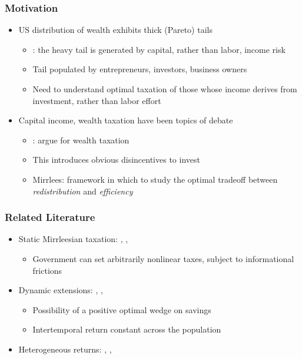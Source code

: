\documentclass{beamer}
\begin{document}
\begin{frame}
    \frametitle{Motivation}

    \begin{itemize}
        \item US distribution of wealth exhibits thick (Pareto) tails
        \begin{itemize}
            \item \cite{benhabib2011distribution}: the heavy tail is generated by capital, rather than labor, income risk 
            \item Tail populated by entrepreneurs, investors, business owners
            \item Need to understand optimal taxation of those whose income derives from investment, rather than labor effort
        \end{itemize} %
        \item Capital income, wealth taxation have been topics of debate
        \begin{itemize}
            \item \cite{saez2019triumph}: argue for wealth taxation 
            \item This introduces obvious disincentives to invest 
            \item Mirrlees: framework in which to study the optimal tradeoff between \textit{redistribution} and \textit{efficiency} 
        \end{itemize}
    \end{itemize}

\end{frame}

\begin{frame}
    \frametitle{Related Literature}

    \begin{itemize}
        \item Static Mirrleesian taxation: \cite{mirrlees1971exploration}, \cite{diamond1998optimal}, \cite{saez2001using}
        \begin{itemize}
            \item Government can set arbitrarily nonlinear taxes, subject to informational frictions
        \end{itemize}
        \item Dynamic extensions: \cite{golosov2003optimal}, \cite{kocherlakota2005zero}, \cite{albanesi2006dynamic}
        \begin{itemize}
            \item Possibility of a positive optimal wedge on savings
            \item Intertemporal return constant across the population
        \end{itemize}
        \item Heterogeneous returns: \cite{shourideh2014optimal}, \cite{phelan2019business}, \cite{phelan2019differential}
    \end{itemize}

\end{frame}
\end{document}
